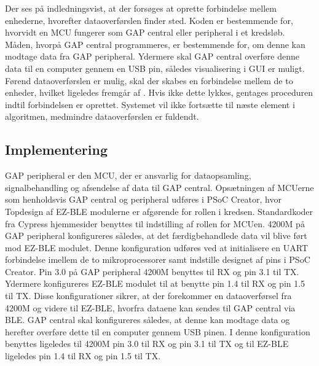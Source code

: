 Der ses på  indledningsvist, at der forsøges at oprette forbindelse mellem enhederne, hvorefter dataoverførslen finder sted. Koden er bestemmende for, hvorvidt en MCU fungerer som GAP central eller peripheral i et kredsløb. Måden, hvorpå GAP central programmeres, er bestemmende for, om denne kan modtage data fra GAP peripheral. Ydermere skal GAP central overføre denne data til en computer gennem en USB pin, således visualisering i GUI er muligt. \newline
Førend dataoverførslen er mulig, skal der skabes en forbindelse mellem de to enheder, hvilket ligeledes fremgår af . Hvis ikke dette lykkes, gentages proceduren indtil forbindelsen er oprettet. Systemet vil ikke fortsætte til næste element i algoritmen, medmindre dataoverførslen er fuldendt.  

\subsection{Implementering}
GAP peripheral er den MCU, der er ansvarlig for dataopsamling, signalbehandling og afsendelse af data til GAP central. Opsætningen af MCUerne som henholdsvis GAP central og peripheral udføres i PSoC Creator, hvor Topdesign af EZ-BLE modulerne er afgørende for rollen i kredsen. Standardkoder fra Cypress hjemmesider benyttes til indstilling af rollen for MCUen. \newline
4200M på GAP peripheral konfigureres således, at det færdigbehandlede data vil blive ført mod EZ-BLE modulet. Denne konfiguration udføres ved at initialisere en UART forbindelse imellem de to mikroprocessorer samt indstille designet af pins i PSoC Creator.
Pin 3.0 på GAP peripheral 4200M benyttes til RX og pin 3.1 til TX. Ydermere konfigureres EZ-BLE modulet til at benytte pin 1.4 til RX og pin 1.5 til TX. Disse konfigurationer sikrer, at der forekommer en dataoverførsel fra 4200M og videre til EZ-BLE, hvorfra dataene kan sendes til GAP central via BLE. \citep{Semiconductor20164200M} \newline
GAP central skal konfigureres således, at denne kan modtage data og herefter overføre dette til en computer gennem USB pinen. I denne konfiguration benyttes ligeledes til 4200M pin 3.0 til RX og pin 3.1 til TX og til EZ-BLE ligeledes pin 1.4 til RX og pin 1.5 til TX.

